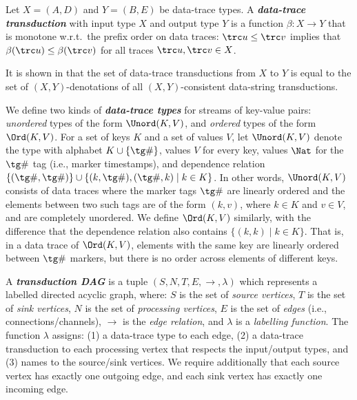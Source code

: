 \begin{definition}
Let $X = (A,D)$ and $Y = (B,E)$ be data-trace types. A \textbf{\em data-trace transduction} with input type $X$ and output type $Y$ is a function $\beta: X \to Y$ that is monotone w.r.t.\ the prefix order on data traces: $\trc u \leq \trc v$ implies that $\beta(\trc u) \leq \beta(\trc v)$ for all traces $\trc u, \trc v \in X$.
\end{definition}

It is shown in  that the set of data-trace transductions from $X$ to $Y$ is equal to the set of $(X,Y)$-denotations of all $(X,Y)$-consistent data-string transductions.

We define two kinds of \textbf{\em data-trace types} for streams of key-value pairs: \emph{unordered} types of the form $\Unord(K,V)$, and \emph{ordered} types of the form $\Ord(K,V)$. For a set of keys $K$ and a set of values $V$, let $\Unord(K, V)$ denote the type with alphabet $K \cup \{\tg\#\}$, values $V$ for every key, values $\Nat$ for the $\tg\#$ tag (i.e., marker timestamps), and dependence relation $\{ (\tg\#, \tg\#) \} \cup \{ (k,\tg\#), (\tg\#,k) \mid k \in K \}$. In other words, $\Unord(K, V)$ consists of data traces where the marker tags $\tg\#$ are linearly ordered and the elements between two such tags are of the form $(k,v)$, where $k \in K$ and $v \in V$, and are completely unordered. We define $\Ord(K, V)$ similarly, with the difference that the dependence relation also contains $\{ (k,k) \mid k \in K \}$. That is, in a data trace of $\Ord(K,V)$, elements with the same key are linearly ordered between $\tg\#$ markers, but there is no order across elements of different keys.

A \textbf{\em transduction DAG} is a tuple $(S,N,T,E,\to,\lambda)$ which represents a labelled directed acyclic graph, where: $S$ is the set of \emph{source vertices}, $T$ is the set of \emph{sink vertices}, $N$ is the set of \emph{processing vertices}, $E$ is the set of \emph{edges} (i.e., connections/channels), $\to$ is the \emph{edge relation}, and $\lambda$ is a \emph{labelling function}. The function $\lambda$ assigns: (1) a data-trace type to each edge, (2) a data-trace transduction to each processing vertex that respects the input/output types, and (3) names to the source/sink vertices. We require additionally that each source vertex has exactly one outgoing edge, and each sink vertex has exactly one incoming edge.


